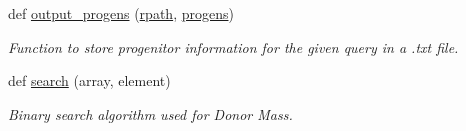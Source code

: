 \begin{DoxyCompactItemize}
def \hyperlink{namespacequery_abd70c38699dfe0661022a6c70496017b}{output\+\_\+progens} (\hyperlink{namespacequery_a9391898f449326a0aae5c74a2f8f2da4}{rpath}, \hyperlink{namespacequery_aadb205048dceb51ed98dc76b0cbc9d00}{progens})
\begin{DoxyCompactList}\small\item\em Function to store progenitor information for the given query in a .txt file. \end{DoxyCompactList}\item 
def \hyperlink{namespacequery_a631cedf881e24bf0a12fc4031158e804}{search} (array, element)
\begin{DoxyCompactList}\small\item\em Binary search algorithm used for Donor Mass. \end{DoxyCompactList}\end{DoxyCompactItemize}
